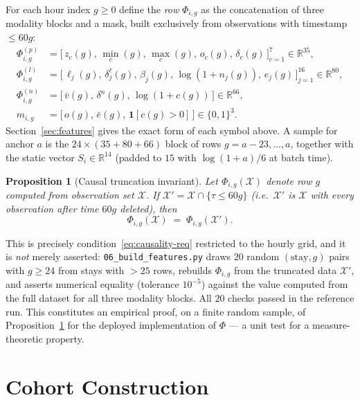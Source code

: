 \documentclass[11pt]{article}
\newtheorem{proposition}{Proposition}[section]
\newcommand{\R}{\mathbb{R}}
\newcommand{\X}{\mathcal{X}}
\newcommand{\1}[1]{\mathbf{1}\!\left[#1\right]}
\begin{document}
For each hour index $g\ge0$ define the \emph{row} $\Phi_{i,g}$ as the concatenation of three modality blocks and a mask, built exclusively from observations with timestamp $\le 60g$:
\begin{align}
\Phi_{i,g}^{(p)} &= \big[\, z_c(g),\, \min_c(g),\, \max_c(g),\, o_c(g),\, \delta_c(g) \,\big]_{c=1}^{7} \in \R^{35}, \\
\Phi_{i,g}^{(l)} &= \big[\, \ell_j(g),\, \delta^{\ell}_j(g),\, \beta_j(g),\, \log(1+n_j(g)),\, e_j(g) \,\big]_{j=1}^{16} \in \R^{80}, \\
\Phi_{i,g}^{(n)} &= \big[\, \bar{v}(g),\, \delta^n(g),\, \log(1+c(g)) \,\big] \in \R^{66}, \\
m_{i,g} &= \big[\, o(g),\, \bar e(g),\, \1{c(g)>0} \,\big] \in \{0,1\}^{3}.
\end{align}
Section~\ref{sec:features} gives the exact form of each symbol above. A sample for anchor $a$ is the $24 \times (35+80+66)$ block of rows $g = a-23, \dots, a$, together with the static vector $S_i \in \R^{14}$ (padded to $15$ with $\log(1+a)/6$ at batch time).

\begin{proposition}[Causal truncation invariant]\label{prop:truncation}
Let $\Phi_{i,g}(\X)$ denote row $g$ computed from observation set $\X$. If $\X' = \X \cap \{\tau \le 60g\}$ (i.e.\ $\X'$ is $\X$ with every observation after time $60g$ deleted), then
\begin{equation}
\Phi_{i,g}(\X) \;=\; \Phi_{i,g}(\X').
\end{equation}
\end{proposition}
This is precisely condition~\eqref{eq:causality-req} restricted to the hourly grid, and it is \emph{not} merely asserted: \texttt{06\_build\_features.py} draws $20$ random $(\mathrm{stay}, g)$ pairs with $g\ge 24$ from stays with $>25$ rows, rebuilds $\Phi_{i,g}$ from the truncated data $\X'$, and asserts numerical equality (tolerance $10^{-5}$) against the value computed from the full dataset for all three modality blocks. All $20$ checks passed in the reference run. This constitutes an empirical proof, on a finite random sample, of Proposition~\ref{prop:truncation} for the deployed implementation of $\Phi$ — a unit test for a measure-theoretic property.

\section{Cohort Construction}
\end{document}
